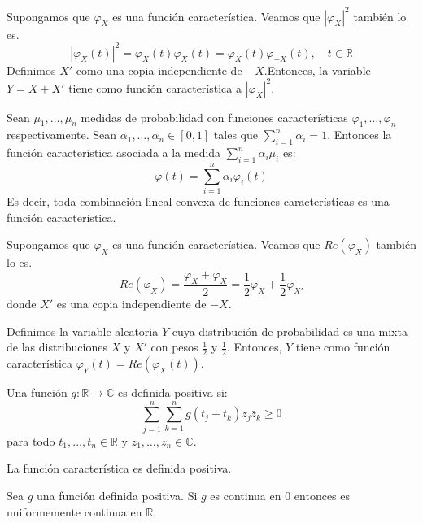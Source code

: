 \begin{exercise}
    Supongamos que $\varphi_X$ es una función característica.
    Veamos que $|\varphi_X|^2$ también lo es.
    $$|\varphi_X(t)|^2 = \varphi_X(t) \overline{\varphi_X(t)} = \varphi_X(t)\varphi_{-X}(t), \quad t \in \mathbb{R}$$
    Definimos $X'$ como una copia independiente de $-X$.Entonces, la variable $Y = X + X'$ tiene como función característica a $|\varphi_X|^2$.
\end{exercise}

\begin{lemma}
    Sean $\mu_1, \dots, \mu_n$ medidas de probabilidad con funciones características $\varphi_1, \dots, \varphi_n$ respectivamente.
    Sean $\alpha_1, \dots, \alpha_n \in [0, 1]$ tales que $\sum_{i=1}^n \alpha_i = 1$.
    Entonces la función característica asociada a la medida $\sum_{i=1}^n \alpha_i\mu_i$ es:
    $$\varphi(t) = \sum_{i=1}^n \alpha_i\varphi_i(t)$$
    Es decir, toda combinación lineal convexa de funciones características es una función característica.
\end{lemma}

\begin{exercise}
    Supongamos que $\varphi_X$ es una función característica.
    Veamos que $Re(\varphi_X)$ también lo es.
    $$Re(\varphi_X) = \frac{\varphi_X + \overline{\varphi_X}}{2} = \frac{1}{2}\varphi_X + \frac{1}{2}\varphi_{X'}$$
    donde $X'$ es una copia independiente de $-X$.

    Definimos la variable aleatoria $Y$ cuya distribución de probabilidad es una mixta de las distribuciones $X$ y $X'$ con pesos $\frac{1}{2}$ y $\frac{1}{2}$.
    Entonces, $Y$ tiene como función característica $\varphi_Y(t) = Re(\varphi_X(t))$.
\end{exercise}

\begin{definition}
    Una función $g: \mathbb{R} \to \mathbb{C}$ es definida positiva si:
    $$\sum_{j=1}^n \sum_{k=1}^n g(t_j-t_k)z_j\bar{z}_k \geq 0$$
    para todo $t_1, \dots, t_n \in \mathbb{R}$ y $z_1, \dots, z_n \in \mathbb{C}$.
\end{definition}

\begin{remark}
    La función característica es definida positiva.
\end{remark}

\begin{theorem}
    Sea $g$ una función definida positiva.
    Si $g$ es continua en 0 entonces es uniformemente continua en $\mathbb{R}$.
\end{theorem}

